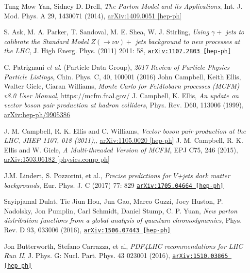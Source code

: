 \documentclass[11pt,a4paper,openright,twoside]{report}
\newcommand{\bibref}[4]{#1, \textit{#2}, #3 #4}
\begin{document}
\begin{thebibliography}{9}
	\bibref{Tung-Mow Yan, Sidney D. Drell}{The Parton Model and its Applications}{Int. J. Mod. Phys. A 29, 1430071 (2014),}{\href{https://arxiv.org/abs/1409.0051}{arXiv:1409.0051 [hep-ph]}}
	
	\bibref{S. Ask, M. A. Parker, T. Sandoval, M. E. Shea, W. J. Stirling}{Using $\gamma +$ jets to calibrate the Standard Model $Z(\rightarrow \nu\nu)+$ jets background to new processes at the LHC}{J. High Energ. Phys. (2011) 2011: 58,}
{\href{https://arxiv.org/abs/1107.2803}{\texttt{arXiv:1107.2803 [hep-ph]}}}

	\bibref{C. Patrignani \textit{et al}. (Particle Data Group)}{2017 Review of Particle Physics - Particle Listings}{Chin. Phys. C, 40, 100001 (2016)}

	\bibref{John Campbell, Keith Ellis, Walter Giele, Ciaran Williams}{Monte Carlo for FeMtobarn processes (MCFM) v8.0 User Manual}{\url{https://mcfm.fnal.gov/}}
	
	\bibref{J. Campbell, K. Ellis}{An update on vector boson pair production at hadron colliders}{Phys. Rev. D60, 113006 (1999),}{\href{https://arxiv.org/abs/hep-ph/9905386}{arXiv:hep-ph/9905386}}

	\bibref{J. M. Campbell, R. K. Ellis and C. Williams}{Vector boson pair production at the LHC, JHEP 1107, 018 (2011),}{\href{https://arxiv.org/abs/1105.0020}{arXiv:1105.0020 [hep-ph]}}

	\bibref{J. M. Campbell, R. K. Ellis and W. Giele}{A Multi-threaded Version of MCFM}{EPJ C75, 246 (2015),}{\href{https://arxiv.org/abs/1503.06182}{arXiv:1503.06182 [physics.comp-ph]}}

	\bibref{J.M. Lindert, S. Pozzorini, et al.}{Precise predictions for $V$+jets dark matter backgrounds}{Eur. Phys. J. C (2017) 77: 829}{\href{https://arxiv.org/abs/1705.04664}{\texttt{arXiv:1705.04664 [hep-ph]}}}
	
	\bibref{Sayipjamal Dulat, Tie Jiun Hou, Jun Gao, Marco Guzzi, Joey Huston, P. Nadolsky, Jon Pumplin, Carl Schmidt, Daniel Stump, C. P. Yuan}{New parton distribution functions from a global analysis of quantum chromodynamics}{Phys. Rev. D 93, 033006 (2016),}{\href{https://arxiv.org/abs/1506.07443}{\texttt{arXiv:1506.07443 [hep-ph]}}}

	\bibref{Jon Butterworth, Stefano Carrazza, et al}{PDF4LHC recommendations for LHC Run II}{J. Phys. G: Nucl. Part. Phys. 43 023001 (2016),}{\href{https://arxiv.org/abs/1510.03865}{\texttt{arXiv:1510.03865 [hep-ph]}}}


\end{thebibliography}
\end{document}
